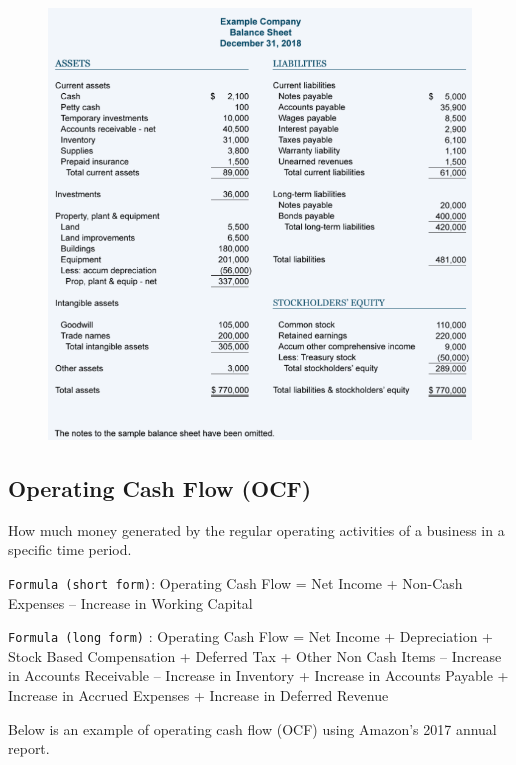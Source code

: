\documentclass[]{book}
\begin{document}
\begin{figure}
\centering
\includegraphics{bs.PNG}
\caption{}
\end{figure}

\subsection{Operating Cash Flow (OCF)}\label{operating-cash-flow-ocf}

How much money generated by the regular operating activities of a
business in a specific time period.

\texttt{Formula\ (short\ form)}: Operating Cash Flow = Net Income +
Non-Cash Expenses -- Increase in Working Capital

\texttt{Formula\ (long\ form)} : Operating Cash Flow = Net Income +
Depreciation + Stock Based Compensation + Deferred Tax + Other Non Cash
Items -- Increase in Accounts Receivable -- Increase in Inventory +
Increase in Accounts Payable + Increase in Accrued Expenses + Increase
in Deferred Revenue

Below is an example of operating cash flow (OCF) using Amazon's 2017
annual report.
\end{document}
